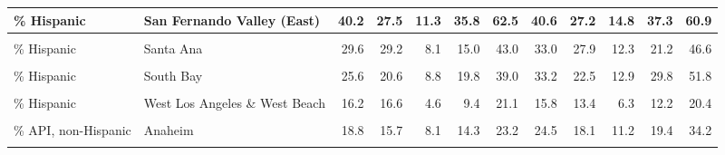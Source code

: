\begin{table}[!h]
\begin{tabular}[t]{l|>{}l||r|r|r|r|r|r|r|r|r|r}
\hline
\% Hispanic & San Fernando Valley (East) & 40.2 & 27.5 & 11.3 & 35.8 & 62.5 & 40.6 & 27.2 & 14.8 & 37.3 & 60.9\\
\hline
\cellcolor{gray!6}{\% Hispanic} & \cellcolor{gray!6}{San Fernando Valley (West)} & \cellcolor{gray!6}{27.4} & \cellcolor{gray!6}{25.0} & \cellcolor{gray!6}{9.4} & \cellcolor{gray!6}{16.4} & \cellcolor{gray!6}{38.8} & \cellcolor{gray!6}{36.8} & \cellcolor{gray!6}{25.9} & \cellcolor{gray!6}{16.2} & \cellcolor{gray!6}{28.8} & \cellcolor{gray!6}{56.9}\\
\hline
\% Hispanic & Santa Ana & 29.6 & 29.2 & 8.1 & 15.0 & 43.0 & 33.0 & 27.9 & 12.3 & 21.2 & 46.6\\
\hline
\cellcolor{gray!6}{\% Hispanic} & \cellcolor{gray!6}{South \& South Central Los Angeles} & \cellcolor{gray!6}{63.6} & \cellcolor{gray!6}{26.9} & \cellcolor{gray!6}{46.5} & \cellcolor{gray!6}{65.9} & \cellcolor{gray!6}{88.3} & \cellcolor{gray!6}{70.5} & \cellcolor{gray!6}{24.8} & \cellcolor{gray!6}{60.2} & \cellcolor{gray!6}{75.7} & \cellcolor{gray!6}{90.2}\\
\hline
\% Hispanic & South Bay & 25.6 & 20.6 & 8.8 & 19.8 & 39.0 & 33.2 & 22.5 & 12.9 & 29.8 & 51.8\\
\hline
\cellcolor{gray!6}{\% Hispanic} & \cellcolor{gray!6}{South Orange Co} & \cellcolor{gray!6}{18.0} & \cellcolor{gray!6}{16.2} & \cellcolor{gray!6}{7.6} & \cellcolor{gray!6}{11.6} & \cellcolor{gray!6}{21.3} & \cellcolor{gray!6}{22.2} & \cellcolor{gray!6}{17.0} & \cellcolor{gray!6}{10.4} & \cellcolor{gray!6}{16.8} & \cellcolor{gray!6}{27.2}\\
\hline
\% Hispanic & West Los Angeles \& West Beach & 16.2 & 16.6 & 4.6 & 9.4 & 21.1 & 15.8 & 13.4 & 6.3 & 12.2 & 20.4\\
\hline
\cellcolor{gray!6}{\% Hispanic} & \cellcolor{gray!6}{Whittier \& North Orange Co} & \cellcolor{gray!6}{47.5} & \cellcolor{gray!6}{24.9} & \cellcolor{gray!6}{27.2} & \cellcolor{gray!6}{46.7} & \cellcolor{gray!6}{67.1} & \cellcolor{gray!6}{56.0} & \cellcolor{gray!6}{23.6} & \cellcolor{gray!6}{39.3} & \cellcolor{gray!6}{59.2} & \cellcolor{gray!6}{75.7}\\
\hline
\% API, non-Hispanic & Anaheim & 18.8 & 15.7 & 8.1 & 14.3 & 23.2 & 24.5 & 18.1 & 11.2 & 19.4 & 34.2\\
\hline
\hline
\cellcolor{gray!6}{\% API, non-Hispanic} & \cellcolor{gray!6}{Covina \& West Covina} & \cellcolor{gray!6}{17.1} & \cellcolor{gray!6}{17.1} & \cellcolor{gray!6}{5.8} & \cellcolor{gray!6}{9.7} & \cellcolor{gray!6}{21.9} & \cellcolor{gray!6}{23.7} & \cellcolor{gray!6}{19.3} & \cellcolor{gray!6}{10.0} & \cellcolor{gray!6}{16.7} & \cellcolor{gray!6}{31.9}\\

\end{tabular}
\end{table}
